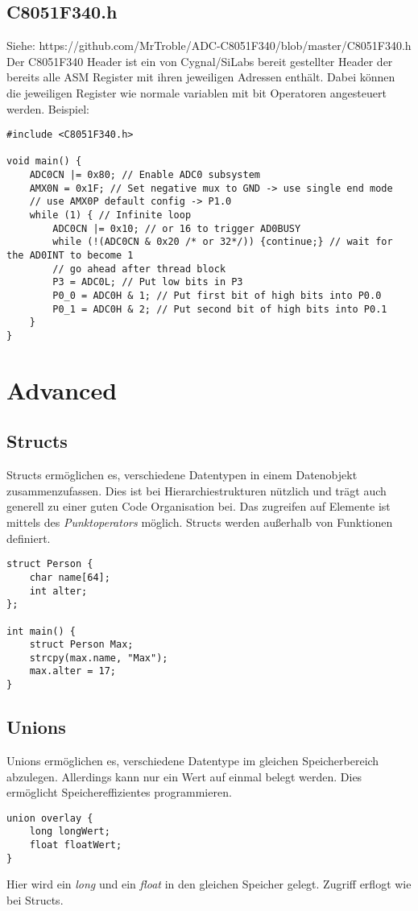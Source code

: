 \documentclass{article}
\begin{document}
\subsection{C8051F340.h}
Siehe: https://github.com/MrTroble/ADC-C8051F340/blob/master/C8051F340.h
\newline\newline
Der C8051F340 Header ist ein von Cygnal/SiLabs bereit gestellter Header der bereits alle ASM Register mit ihren jeweiligen Adressen enthält. Dabei können die jeweiligen Register wie normale variablen mit bit Operatoren angesteuert werden. Beispiel:
\begin{verbatim}
#include <C8051F340.h>

void main() {
    ADC0CN |= 0x80; // Enable ADC0 subsystem
    AMX0N = 0x1F; // Set negative mux to GND -> use single end mode
    // use AMX0P default config -> P1.0
    while (1) { // Infinite loop
        ADC0CN |= 0x10; // or 16 to trigger AD0BUSY
        while (!(ADC0CN & 0x20 /* or 32*/)) {continue;} // wait for the AD0INT to become 1
        // go ahead after thread block
        P3 = ADC0L; // Put low bits in P3
        P0_0 = ADC0H & 1; // Put first bit of high bits into P0.0
        P0_1 = ADC0H & 2; // Put second bit of high bits into P0.1
    }
}
\end{verbatim}

\section{Advanced}

\subsection{Structs}

Structs ermöglichen es, verschiedene Datentypen in einem Datenobjekt zusammenzufassen. Dies ist bei Hierarchiestrukturen nützlich und trägt auch generell zu einer guten Code Organisation bei. Das zugreifen auf Elemente ist mittels des \textit{Punktoperators} möglich.
Structs werden außerhalb von Funktionen definiert.
\begin{verbatim}
struct Person {
    char name[64];
    int alter;
};

int main() {
    struct Person Max;
    strcpy(max.name, "Max");
    max.alter = 17;
}
\end{verbatim}

\subsection{Unions}
Unions ermöglichen es, verschiedene Datentype im gleichen Speicherbereich abzulegen. Allerdings kann nur ein Wert auf einmal belegt werden. Dies ermöglicht Speichereffizientes programmieren.
\begin{verbatim}
union overlay {
    long longWert;
    float floatWert;
}
\end{verbatim}
Hier wird ein \textit{long} und ein \textit{float} in den gleichen Speicher gelegt. Zugriff erflogt wie bei Structs.
\end{document}
